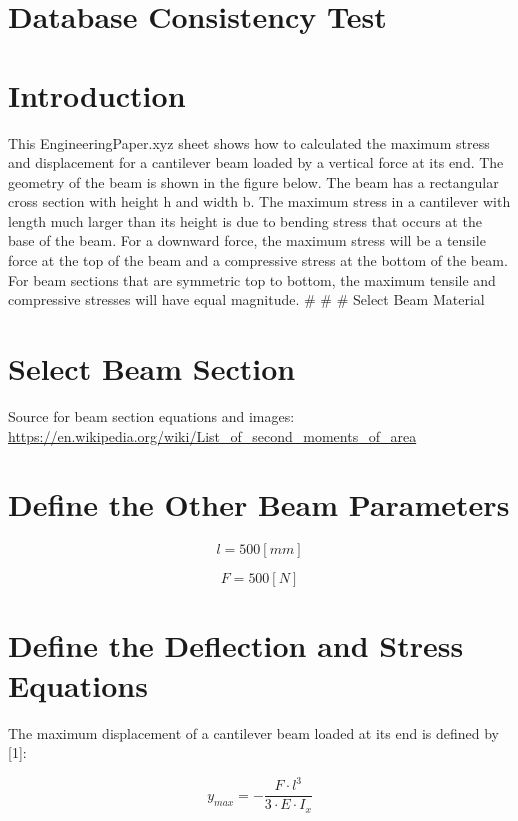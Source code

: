 \documentclass[
  a4paper,
]{article}
\author{}
\date{}
\begin{document}
\section{Database Consistency Test}\label{database-consistency-test}

\section{Introduction}\label{introduction}

This EngineeringPaper.xyz sheet shows how to calculated the maximum
stress and displacement for a cantilever beam loaded by a vertical force
at its end. The geometry of the beam is shown in the figure below. The
beam has a rectangular cross section with height h and width b. The
maximum stress in a cantilever with length much larger than its height
is due to bending stress that occurs at the base of the beam. For a
downward force, the maximum stress will be a tensile force at the top of
the beam and a compressive stress at the bottom of the beam. For beam
sections that are symmetric top to bottom, the maximum tensile and
compressive stresses will have equal magnitude. \# \# \# Select Beam
Material

\section{Select Beam Section}\label{select-beam-section}

Source for beam section equations and images:
\url{https://en.wikipedia.org/wiki/List_of_second_moments_of_area}

\section{Define the Other Beam
Parameters}\label{define-the-other-beam-parameters}

\[ l=500\left[mm\right]   \]

\[ F=500\left[N\right]   \]

\section{Define the Deflection and Stress
Equations}\label{define-the-deflection-and-stress-equations}

The maximum displacement of a cantilever beam loaded at its end is
defined by {[}1{]}:

\[ y_{max}=-\frac{F\cdot l^{3}}{3\cdot E\cdot I_{x}}   \]
\end{document}
